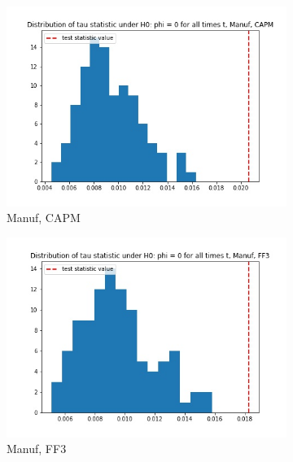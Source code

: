 \documentclass{article}
\begin{document}
  \begin{figure}
  \centering
  \begin{subfigure}[b]{0.3\textwidth}
    \centering
    \includegraphics[width=\textwidth]{Manuf/tau_hist_02_CAPM.jpg}
    \caption{Manuf, CAPM}
    \label{fig:1}
  \end{subfigure}
  \begin{subfigure}[b]{0.3\textwidth}
    \centering
    \includegraphics[width=\textwidth]{Manuf/tau_hist_02_FF3.jpg}
    \caption{Manuf, FF3}
    \label{fig:2}
  \end{subfigure}
    \begin{subfigure}[b]{0.3\textwidth}
    \centering

\end{subfigure}
\end{figure}
\end{document}

